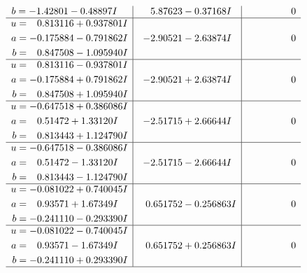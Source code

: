 \documentclass[1p]{elsarticle_modified}
\theoremstyle{definition}
\begin{document}
$$\begin{array}{c|c|c}
\begin{aligned}
b &= -1.42801 - 0.48897 I\end{aligned}
 & \phantom{-}5.87623 - 0.37168 I & \phantom{-0.000000 } 0 \\ \hline\begin{aligned}
u &= \phantom{-}0.813116 + 0.937801 I \\
a &= -0.175884 - 0.791862 I \\
b &= \phantom{-}0.847508 - 1.095940 I\end{aligned}
 & -2.90521 - 2.63874 I & \phantom{-0.000000 } 0 \\ \hline\begin{aligned}
u &= \phantom{-}0.813116 - 0.937801 I \\
a &= -0.175884 + 0.791862 I \\
b &= \phantom{-}0.847508 + 1.095940 I\end{aligned}
 & -2.90521 + 2.63874 I & \phantom{-0.000000 } 0 \\ \hline\begin{aligned}
u &= -0.647518 + 0.386086 I \\
a &= \phantom{-}0.51472 + 1.33120 I \\
b &= \phantom{-}0.813443 + 1.124790 I\end{aligned}
 & -2.51715 + 2.66644 I & \phantom{-0.000000 } 0 \\ \hline\begin{aligned}
u &= -0.647518 - 0.386086 I \\
a &= \phantom{-}0.51472 - 1.33120 I \\
b &= \phantom{-}0.813443 - 1.124790 I\end{aligned}
 & -2.51715 - 2.66644 I & \phantom{-0.000000 } 0 \\ \hline\begin{aligned}
u &= -0.081022 + 0.740045 I \\
a &= \phantom{-}0.93571 + 1.67349 I \\
b &= -0.241110 - 0.293390 I\end{aligned}
 & \phantom{-}0.651752 - 0.256863 I & \phantom{-0.000000 } 0 \\ \hline\begin{aligned}
u &= -0.081022 - 0.740045 I \\
a &= \phantom{-}0.93571 - 1.67349 I \\
b &= -0.241110 + 0.293390 I\end{aligned}
 & \phantom{-}0.651752 + 0.256863 I & \phantom{-0.000000 } 0\\
 \hline 
 \end{array}$$\newpage$$\begin{array}{c|c|c}  

\end{array}$$
\end{document}
